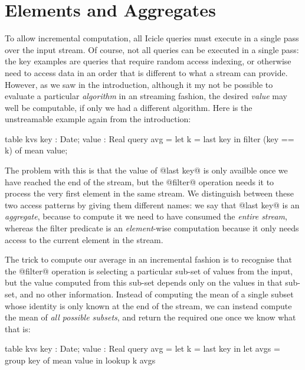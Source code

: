 
\eject
\section{Elements and Aggregates}

To allow incremental computation, all Icicle queries must execute in a single pass over the input stream. Of course, not all queries can be executed in a single pass: the key examples are queries that require random access indexing, or otherwise need to access data in an order that is different to what a stream can provide. However, as we saw in the introduction, although it my not be possible to evaluate a particular \emph{algorithm} in an streaming fashion, the desired \emph{value} may well be computable, if only we had a different algorithm. Here is the unstreamable example again from the introduction:
\begin{code}
  table kvs { key : Date; value : Real }
  query avg = let k = last key
              in  filter (key == k) of mean value;
\end{code}

The problem with this is that the value of @last key@ is only availble once we have reached the end of the stream, but the @filter@ operation needs it to process the very first element in the same stream. We distinguish between these two access patterns by giving them different names: we say that @last key@ is an \emph{aggregate}, because to compute it we need to have consumed the \emph{entire stream}, whereas the filter predicate is an \emph{element}-wise computation because it only needs access to the current element in the stream.

The trick to compute our average in an incremental fashion is to recognise that the @filter@ operation is selecting a particular sub-set of values from the input, but the value computed from this sub-set depends only on the values in that sub-set, and no other information. Instead of computing the mean of a single subset whose identity is only known at the end of the stream, we can instead compute the mean of \emph{all possible subsets}, and return the required one once we know what that is:
\begin{code}
  table kvs { key : Date; value : Real } 
  query avg = let k    = last  key in
              let avgs = group key of mean value
              in  lookup k avgs
\end{code}

